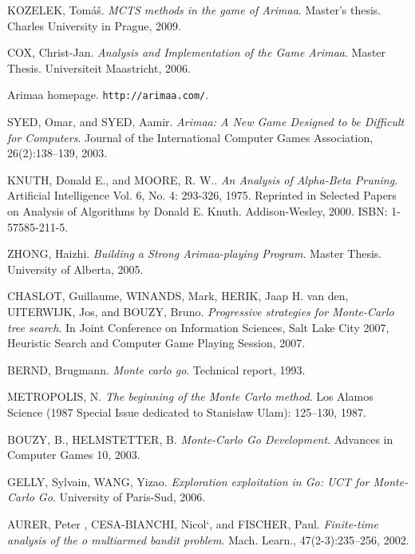 \def\bibname{Literature}
\begin{thebibliography}{99}
\addcontentsline{toc}{chapter}{\bibname}

	{\sc KOZELEK,} Tomáš.
	\emph{MCTS methods in the game of Arimaa}.
	Master's thesis.
	Charles University in Prague, 2009.

	{\sc COX,} Christ-Jan.
	\emph{Analysis and Implementation of the Game Arimaa}.
	Master Thesis.
	Universiteit Maastricht, 2006.

	Arimaa homepage.
	\texttt{http://arimaa.com/}.

	{\sc SYED,} Omar, and {\sc SYED,} Aamir.
	\emph{Arimaa: A New Game Designed to be Difficult for Computers}.
	Journal of the International Computer Games Association, 26(2):138–139, 2003.

	{\sc KNUTH,} Donald E., and {\sc MOORE,} R. W..
	\emph{An Analysis of Alpha-Beta Pruning}.
	Artificial Intelligence Vol. 6, No. 4: 293-326, 1975. Reprinted in Selected
	Papers on Analysis of Algorithms by Donald E. Knuth. Addison-Wesley, 2000.
	ISBN: 1-57585-211-5.

	{\sc ZHONG,} Haizhi.
	\emph{Building a Strong Arimaa-playing Program}.
	Master Thesis.
	University of Alberta, 2005.

	{\sc CHASLOT,} Guillaume, {\sc WINANDS,} Mark, {\sc HERIK,} Jaap H. van den,
	{\sc UITERWIJK,} Jos, and {\sc BOUZY,} Bruno.
	\emph{Progressive strategies for Monte-Carlo tree search}.
	In Joint Conference on Information Sciences, Salt Lake City 2007, Heuristic
	Search and Computer Game Playing Session, 2007.

	{\sc BERND,} Brugmann.
	\emph{Monte carlo go}.
	Technical report, 1993.

	{\sc METROPOLIS,} N.
	\emph{The beginning of the Monte Carlo method}.
	Los Alamos Science (1987 Special Issue dedicated to Stanisław Ulam):
	125–130, 1987.

	{\sc BOUZY,} B., {\sc HELMSTETTER,} B.
	\emph{Monte-Carlo Go Development}.
	Advances in Computer Games 10, 2003.

	{\sc GELLY,} Sylvain, {\sc WANG,} Yizao.
	\emph{Exploration exploitation in Go: UCT for Monte-Carlo Go}.
	University of Paris-Sud, 2006.

	{\sc AURER,} Peter , {\sc CESA-BIANCHI,} Nicol`, and {\sc FISCHER,} Paul.
	\emph{Finite-time analysis of the o multiarmed bandit problem}.
	Mach. Learn., 47(2-3):235–256, 2002.


\end{thebibliography}
